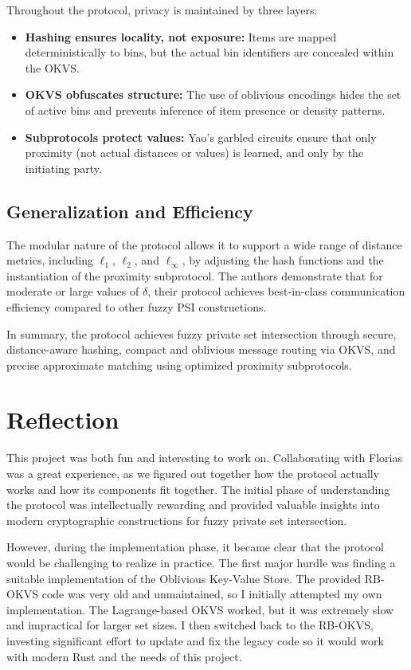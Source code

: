 Throughout the protocol, privacy is maintained by three layers:

\begin{itemize}
	\item \textbf{Hashing ensures locality, not exposure:} Items are mapped deterministically to bins, but the actual bin identifiers are concealed within the OKVS.

	\item \textbf{OKVS obfuscates structure:} The use of oblivious encodings hides the set of active bins and prevents inference of item presence or density patterns.

	\item \textbf{Subprotocols protect values:} Yao's garbled circuits ensure that only proximity (not actual distances or values) is learned, and only by the initiating party.
\end{itemize}

\subsection{Generalization and Efficiency}

The modular nature of the protocol allows it to support a wide range of distance metrics, including $\ell_1$, $\ell_2$, and $\ell_\infty$, by adjusting the hash functions and the instantiation of the proximity subprotocol. The authors demonstrate that for moderate or large values of $\delta$, their protocol achieves best-in-class communication efficiency compared to other fuzzy PSI constructions.

In summary, the protocol achieves fuzzy private set intersection through secure, distance-aware hashing, compact and oblivious message routing via OKVS, and precise approximate matching using optimized proximity subprotocols.

\section{Reflection}

This project was both fun and interesting to work on. Collaborating with Florias was a great experience, as we figured out together how the protocol actually works and how its components fit together. The initial phase of understanding the protocol was intellectually rewarding and provided valuable insights into modern cryptographic constructions for fuzzy private set intersection.

However, during the implementation phase, it became clear that the protocol would be challenging to realize in practice. The first major hurdle was finding a suitable implementation of the Oblivious Key-Value Store. The provided RB-OKVS code was very old and unmaintained, so I initially attempted my own implementation. The Lagrange-based OKVS worked, but it was extremely slow and impractical for larger set sizes. I then switched back to the RB-OKVS, investing significant effort to update and fix the legacy code so it would work with modern Rust and the needs of this project.

